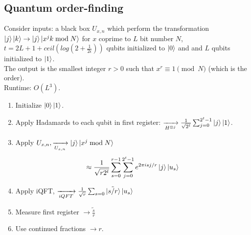 \documentclass{article}
\begin{document}
\subsection{Quantum order-finding}
Consider inputs: a black box $U_{x,n}$ which perform the transformation $\ket{j}\ket{k} \to \ket{j}\ket{x^j k \bmod N}$ for $x$ coprime to $L$ bit number $N$, $t = 2L + 1 + ceil(log(2+\frac{1}{2\epsilon}))$ qubits initialized to $\ket0$ and and $L$ qubits initialized to $\ket{1}$.\\
The output is the smallest integer $r>0$ such that $x^r \equiv 1 \pmod{N}$ (which is the order).\\
Runtime: $O(L^3)$.\\
\begin{enumerate}
	\item Initialize $\ket{0}\ket{1}$.
	\item Apply Hadamards to each qubit in first register: $\xrightarrow[H^{\otimes j}]{} \frac{1}{\sqrt{2^t}} \sum_{j=0}^{2^t-1} \ket{j}\ket{1}$.
	\item Apply $U_{x,n}, \xrightarrow[U_{x,n}]{} \ket{j}\ket{x^j \bmod N}$
		$$ \approx \frac{1}{\sqrt{r2^t}} \sum^{r-1}_{s=0} \sum^{2^t-1}_{j=0}e^{2\pi i sj/r}\ket{j}\ket{u_s}$$
	\item Apply iQFT, $\xrightarrow[iQFT]{} \frac{1}{\sqrt{r}} \sum_{s=0} \ket{\tilde{s/r}} \ket{u_s}$
	\item Measure first register $\to \tilde{\frac{s}{r}}$
	\item Use continued fractions $\to r$.
\end{enumerate}
\end{document}
